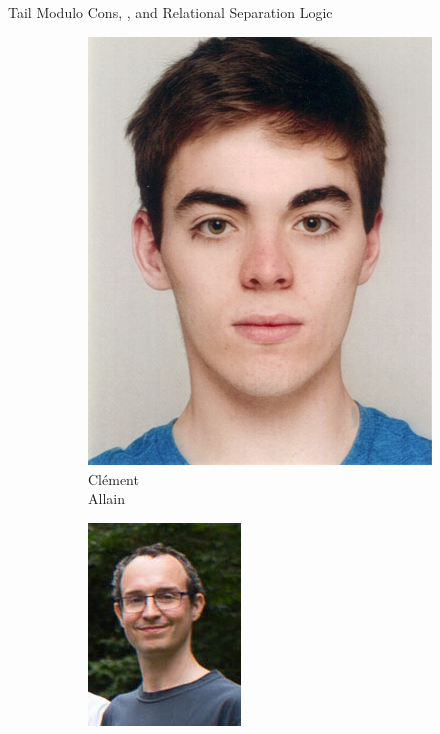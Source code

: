 \begin{frame}{Tail Modulo Cons, \OCaml, and Relational Separation Logic}
\begin{figure}
  \begin{subfigure}[b]{0.16\textwidth}
    \includegraphics[scale=0.6]{images/clement_allain.jpg}
    \caption*{\footnotesize Clément \\ Allain}
  \end{subfigure}
  \begin{subfigure}[b]{0.16\textwidth}
    \includegraphics[scale=1.3]{images/frederic_bour.jpg}

\end{subfigure}
\end{figure}
\end{frame}
